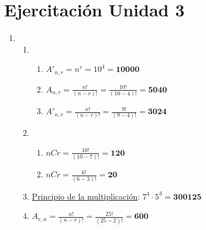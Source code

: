 \documentclass[12pt,letterpaper]{article}
\begin{document}
\section*{Ejercitación Unidad 3}

\begin{enumerate}


    \item
    \begin{enumerate}
        \item
            \begin{enumerate}[label=(\roman*)]
                \item $ A'_{n,r} = n^{r}= 10^{4} = \textbf{10000} $
                \item $ A_{n,r} = \frac{n!}{(n-r)!} =  \frac{10!}{(10-4)!} = \textbf{5040}$
                \item $ A'_{n,r} = \frac{n!}{(n-r)!} = \frac{9!}{(9-4)!} = \textbf{3024}$
            \end{enumerate}

        \item
            \begin{enumerate}[label=(\roman*)]
                \item $ nCr = \frac{10!}{(10-7)!} = \textbf{120} $
                \item $ nCr = \frac{6!}{(6-3)!} = \textbf{20} $
            \end{enumerate}

        \item \underline{Principio de la multiplicación}: $ 7^{4}\cdot5^{3}=\textbf{300125} $
        \item $ A_{r,n}=\frac{n!}{(n-r)!}=\frac{25!}{(25-2)!}=\textbf{600} $
    \end{enumerate}


\end{enumerate}
\end{document}
